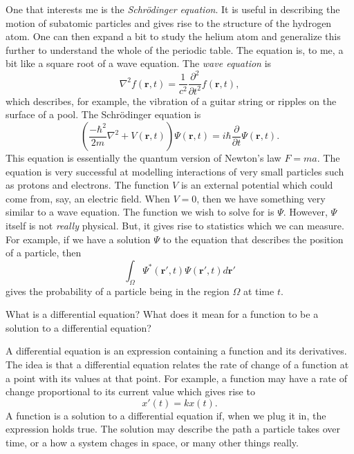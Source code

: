 \documentclass[12pt]{article} %
\begin{document}
\begin{solution}
    One that interests me is the \emph{Schr\"odinger equation}. It is useful in describing the motion of subatomic particles and gives rise to the structure of the hydrogen atom.  One can then expand a bit to study the helium atom and generalize this further to understand the whole of the periodic table.  The equation is, to me, a bit like a square root of a wave equation. The \emph{wave equation} is
    \[
    \nabla^2 f(\mathbf{r},t) = \frac{1}{c^2}\frac{\partial^2}{\partial t^2}f(\mathbf{r},t),
    \]
    which describes, for example, the vibration of a guitar string or ripples on the surface of a pool. The Schr\"odinger equation is 
    \[
    \left( \frac{-\hbar^2}{2m}\nabla^2 + V(\mathbf{r},t)\right) \Psi(\mathbf{r},t) = i\hbar \frac{\partial}{\partial t}\Psi (\mathbf{r},t).
    \]
    This equation is essentially the quantum version of Newton's law $F=ma$. The equation is very successful at modelling interactions of very small particles such as protons and electrons.  The function $V$ is an external potential which could come from, say, an electric field. When $V=0$, then we have something very similar to a wave equation. The function we wish to solve for is $\Psi$. However, $\Psi$ itself is not \emph{really} physical.  But, it gives rise to statistics which we can measure.  For example, if we have a solution $\Psi$ to the equation that describes the position of a particle, then
    \[
    \int_\Omega \Psi^*(\mathbf{r}',t) \Psi(\mathbf{r}',t) d\mathbf{r}'
    \]
    gives the probability of a particle being in the region $\Omega$ at time $t$.
\end{solution}

\newpage

\begin{problem}
    What is a differential equation? What does it mean for a function to be a solution to a differential equation?
\end{problem}

\begin{solution}
    A differential equation is an expression containing a function and its derivatives. The idea is that a differential equation relates the rate of change of a function at a point with its values at that point.  For example, a function may have a rate of change proportional to its current value which gives rise to
    \[
    x'(t)=kx(t).
    \]
    A function is a solution to a differential equation if, when we plug it in, the expression holds true. The solution may describe the path a particle takes over time, or a how a system chages in space, or many other things really.   
\end{solution}
\end{document}
